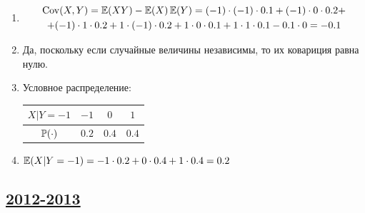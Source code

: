 \begin{enumerate}
\begin{enumerate}
\item
\begin{multline*}
\Cov(X, Y) = \E(XY) - \E(X) \E(Y)  = (-1)\cdot (-1) \cdot 0.1 + (-1) \cdot 0 \cdot 0.2 + \\
+ (-1) \cdot 1 \cdot 0.2 + 1 \cdot (-1) \cdot 0.2 + 1 \cdot 0 \cdot 0.1 + 1 \cdot 1 \cdot 0.1 -
0.1 \cdot 0 = -0.1
\end{multline*}
\item Да, поскольку если случайные величины независимы, то их ковариция равна нулю.
\item Условное распределение:
\begin{center}
\begin{tabular}{@{}cccc@{}}
\toprule
$X|Y=-1$    & $-1$  & $0$   & $1$   \\ \midrule
$\P(\cdot)$ & $0.2$ & $0.4$ & $0.4$ \\ \bottomrule
\end{tabular}
\end{center}
\item $\E(X | Y = -1) = -1 \cdot 0.2 + 0 \cdot 0.4 + 1 \cdot 0.4 = 0.2$
\end{enumerate}
\end{enumerate}




\subsection[2012-2013]{\hyperref[sec:kr_01_2012_2013]{2012-2013}}
\label{sec:sol_kr_01_2012_2013}

